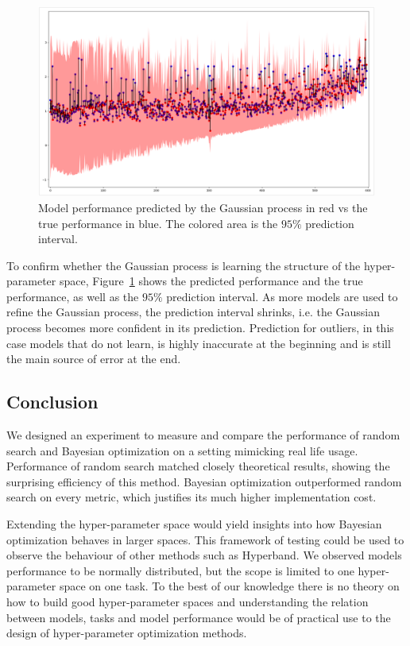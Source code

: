\begin{figure}[htb]
	\centering
	\includegraphics[width=\linewidth]{img_hyperopt/bo_error_time.png}
	\caption[Model performance predicted by the Gaussian process vs the true performance]{Model performance predicted by the Gaussian process in red vs the true performance in blue. The colored area is the $95 \%$ prediction interval.}
	\label{fig:bo_error_time}
\end{figure}

To confirm whether the Gaussian process is learning the structure of the hyper-parameter space, Figure~\ref{fig:bo_error_time} shows the predicted performance and the true performance, as well as the $95 \%$ prediction interval. As more models are used to refine the Gaussian process, the prediction interval shrinks, i.e. the Gaussian process becomes more confident in its prediction. Prediction for outliers, in this case models that do not learn, is highly inaccurate at the beginning and is still the main source of error at the end.

\subsection{Conclusion}

We designed an experiment to measure and compare the performance of random search and Bayesian optimization on a setting mimicking real life usage. Performance of random search matched closely theoretical results, showing the surprising efficiency of this method. Bayesian optimization outperformed random search on every metric, which justifies its much higher implementation cost.

Extending the hyper-parameter space would yield insights into how Bayesian optimization behaves in larger spaces. This framework of testing could be used to observe the behaviour of other methods such as Hyperband. We observed models performance to be normally distributed, but the scope is limited to one hyper-parameter space on one task. To the best of our knowledge there is no theory on how to build good hyper-parameter spaces and understanding the relation between models, tasks and model performance would be of practical use to the design of hyper-parameter optimization methods.

